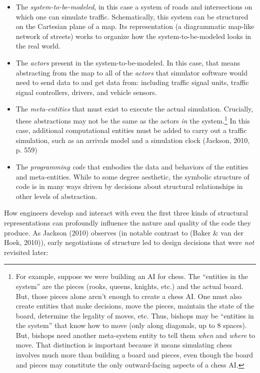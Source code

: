 \begin{itemize}
\item
  The \emph{system-to-be-modeled}, in this case a system of roads and
  intersections on which one can simulate traffic. Schematically, this
  system can be structured on the Cartesian plane of a map. Its
  representation (a diagrammatic map-like network of streets) works to
  organize how the system-to-be-modeled looks in the real world.
\item
  The \emph{actors} present in the system-to-be-modeled. In this case,
  that means abstracting from the map to all of the \emph{actors} that
  simulator software would need to send data to and get data from:
  including traffic signal units, traffic signal controllers, drivers,
  and vehicle sensors.
\item
  The \emph{meta-entities} that must exist to execute the actual
  simulation. Crucially, these abstractions may not be the same as the
  actors \emph{in} the system.\footnote{For example, suppose we were
    building an AI for chess. The ``entities in the system'' are the
    pieces (rooks, queens, knights, etc.) and the actual board. But,
    those pieces alone aren't enough to create a chess AI. One must also
    create entities that make decisions, move the pieces, maintain the
    state of the board, determine the legality of moves, etc. Thus,
    bishops may be ``entities in the system'' that know how to move
    (only along diagonals, up to 8 spaces). But, bishops need another
    meta-system entity to tell them \emph{when} and \emph{where} to
    move. That distinction is important because it means simulating
    chess involves much more than building a board and pieces, even
    though the board and pieces may constitute the only outward-facing
    aspects of a chess AI.} In this case, additional computational
  entities must be added to carry out a traffic simulation, such as an
  arrivals model and a simulation clock (Jackson, 2010, p. 559)
\item
  The \emph{programming code} that embodies the data and behaviors of
  the entities and meta-entities. While to some degree aesthetic, the
  symbolic structure of code is in many ways driven by decisions about
  structural relationships in other levels of abstraction.
\end{itemize}

How engineers develop and interact with even the first three kinds of
structural representations can profoundly influence the nature and
quality of the code they produce. As Jackson (2010) observes (in notable
contrast to (Baker \& van der Hoek, 2010)), early negotiations of
structure led to design decisions that were \emph{not} revisited later:

